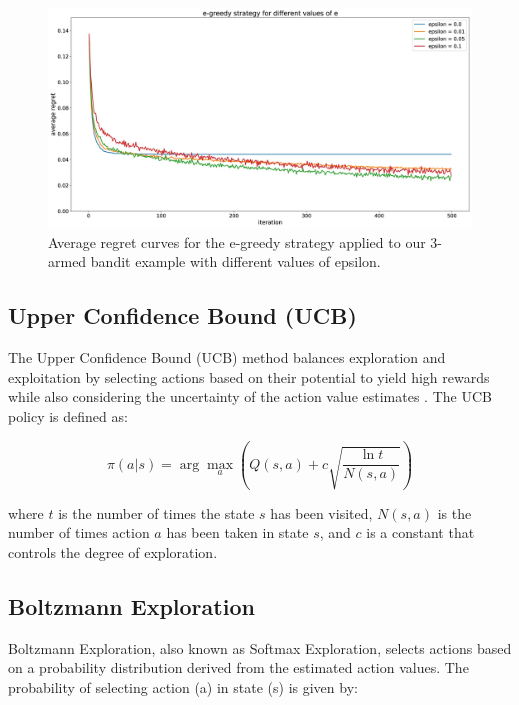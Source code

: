 \documentclass[../Main.tex]{subfiles}
\begin{document}
\begin{figure}[H]
    \centering
    \includegraphics[width=1\linewidth]{img/results/epsilon-greedy.png}
    \caption{Average regret curves for the e-greedy strategy applied to our 3-armed bandit example with different values of epsilon.}
    \label{fig:enter-label}
\end{figure}

\subsection{Upper Confidence Bound (UCB)}

The Upper Confidence Bound (UCB) method balances exploration and exploitation by selecting actions based on their potential to yield high rewards while also considering the uncertainty of the action value estimates \cite{auer2002finite}. The UCB policy is defined as:

\begin{equation}
    \pi(a|s) = \arg\max_{a} \left( Q(s, a) + c \sqrt{\frac{\ln t}{N(s, a)}} \right)
\end{equation}

where \(t\) is the number of times the state \(s\) has been visited, \(N(s, a)\) is the number of times action \(a\) has been taken in state \(s\), and \(c\) is a constant that controls the degree of exploration.

\subsection{Boltzmann Exploration}

Boltzmann Exploration, also known as Softmax Exploration, selects actions based on a probability distribution derived from the estimated action values. The probability of selecting action (a) in state (s) is given by:
\end{document}
